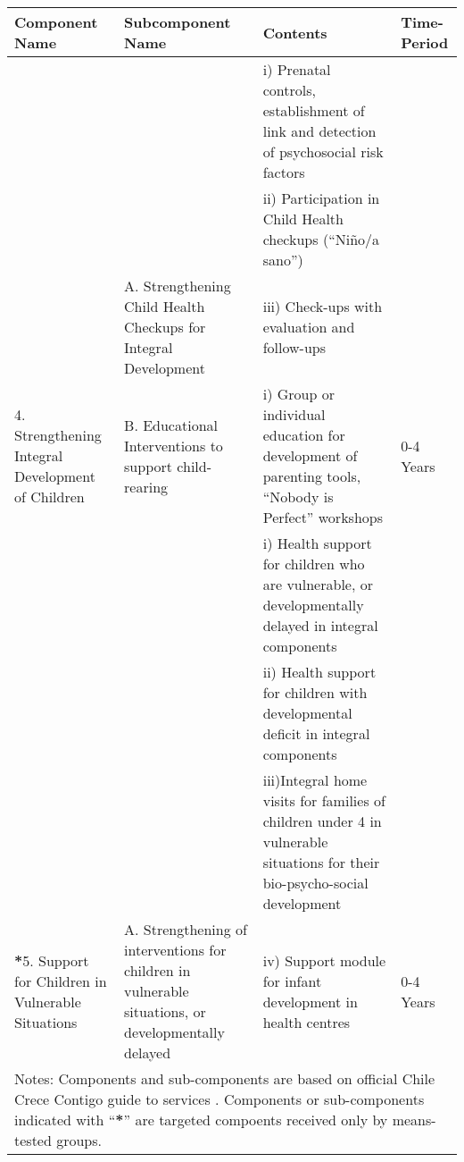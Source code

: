 \documentclass[12pt]{article}
\begin{document}
\begin{spacing}{1.4}
\begin{landscape}
\begin{table}[htpb!]
  \begin{tabular}{p{4.5cm}p{5cm}p{10cm}p{2.5cm}}
    \toprule
    Component Name & Subcomponent Name & Contents & Time-Period\\ \midrule
&\cellcolor{dccol}&\cellcolor{dccol}i) Prenatal controls, establishment of link and detection of psychosocial risk factors  & \\
&   \cellcolor{dccol}         &ii) Participation in Child Health checkups (``Ni\~no/a sano'') & \\
&  \multirow{-3.8}{5cm}{\cellcolor{dccol}A. Strengthening Child Health Checkups for Integral Development} &\cellcolor{dccol}iii) Check-ups with evaluation and follow-ups & \\
    \multirow{-4}{4.5cm}{4. Strengthening Integral Development of Children} &B. Educational Interventions to support child-rearing&i) Group or individual education for development of parenting tools, ``Nobody is Perfect'' workshops&\multirow{-4}{2.5cm}{0-4 Years}\\ \midrule %
\cellcolor{dccol}&\cellcolor{dccol} &\cellcolor{dccol} i) Health support for children who are vulnerable, or developmentally delayed in integral components&\cellcolor{dccol} \\
\cellcolor{dccol}&\cellcolor{dccol}&ii) Health support for children with developmental deficit in integral components&\cellcolor{dccol}\\
\cellcolor{dccol}&\cellcolor{dccol}&\cellcolor{dccol} iii)Integral home visits for families of children under 4 in vulnerable situations for their bio-psycho-social development&\cellcolor{dccol}\\
\multirow{-6}{4.5cm}{\cellcolor{dccol}\textbf{*}5. Support for Children in Vulnerable Situations}&\multirow{-6}{5cm}{\cellcolor{dccol}A. Strengthening of interventions for children in vulnerable situations, or developmentally delayed}&iv) Support module for infant development in health centres &\multirow{-2}{2.5cm}{\cellcolor{dccol} 0-4 Years}\\ \midrule
\multicolumn{4}{p{22cm}}{Notes: Components and sub-components are based on official Chile Crece Contigo guide to services \citep{MDS2014}. Components or sub-components indicated with ``\textbf{*}'' are targeted compoents received only by means-tested groups.} \\
\bottomrule


\end{tabular}
\end{table}
\end{landscape}
\end{spacing}
\end{document}
